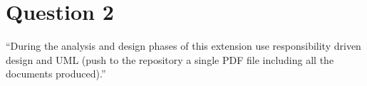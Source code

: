 \section{Question 2}

``During the analysis and design phases of this extension use responsibility driven design and UML
(push to the repository a single PDF file including all the documents produced).''